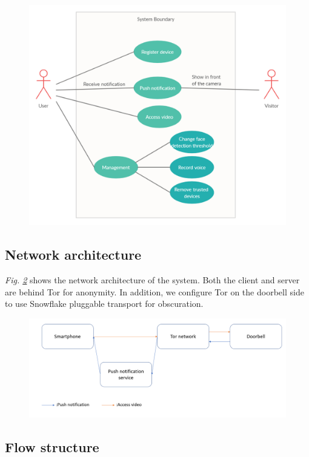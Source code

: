 \begin{figure}
	\includegraphics[width=\linewidth]{Use_case_diagram.png}
	\caption{}
	\label{fig:usecase}
\end{figure}

\subsection{Network architecture}
\textit{Fig. \ref{fig:architecture}} shows the network architecture of the system. Both the client and server are behind Tor for anonymity. In addition, we configure Tor on the doorbell side to use Snowflake \cite{snowflake} pluggable transport for obscuration.

\begin{figure}
	\includegraphics[width=\linewidth]{architecture.png}
	\caption{}
	\label{fig:architecture}
\end{figure}

\subsection{Flow structure}

